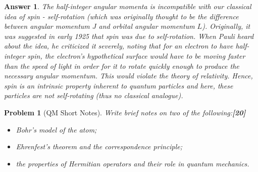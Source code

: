 \documentclass[a4paper]{article}
\newtheorem{ans}{Answer}[subsection]
\theoremstyle{new}
\newtheorem{qns}{Problem}[subsection]
\begin{document}
\begin{ans}
The half-integer angular momenta is incompatible with our classical idea of spin - self-rotation (which was originally thought to be the difference between angular momentum $J$ and orbital angular momentum $L$). Originally, it was suggested in early 1925 that spin was due to self-rotation. When Pauli heard about the idea, he criticized it severely, noting that for an electron to have half-integer spin, the electron's hypothetical surface would have to be moving faster than the speed of light in order for it to rotate quickly enough to produce the necessary angular momentum. This would violate the theory of relativity. Hence, spin is an intrinsic property inherent to quantum particles and here, these particles are not self-rotating (thus no classical analogue).
\end{ans}
\newpage
\begin{qns}[QM Short Notes]
Write brief notes on two of the following:\hfill\textbf{[20]}
\begin{itemize}
    \item Bohr’s model of the atom;
    \item Ehrenfest’s theorem and the correspondence principle;
    \item the properties of Hermitian operators and their role in quantum mechanics.
\end{itemize}
\end{qns}
\end{document}
